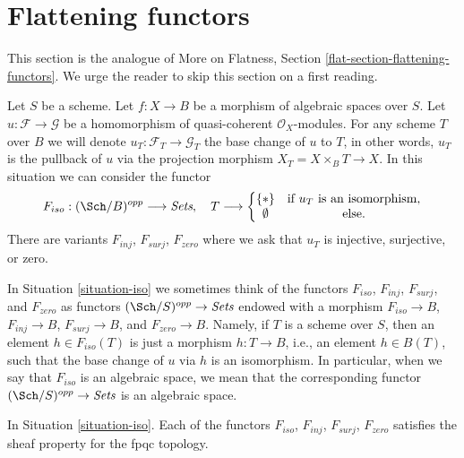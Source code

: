 \section{Flattening functors}
\label{section-F-zero}

\noindent
This section is the analogue of
More on Flatness, Section \ref{flat-section-flattening-functors}.
We urge the reader to skip this section on a first reading.

\begin{situation}
\label{situation-iso}
Let $S$ be a scheme.
Let $f : X \to B$ be a morphism of algebraic spaces over $S$.
Let $u : \mathcal{F} \to \mathcal{G}$ be a homomorphism of
quasi-coherent $\mathcal{O}_X$-modules. For any scheme $T$ over
$B$ we will denote $u_T : \mathcal{F}_T \to \mathcal{G}_T$ the
base change of $u$ to $T$, in other words, $u_T$ is the pullback
of $u$ via the projection morphism $X_T = X \times_B T \to X$.
In this situation we can consider the functor
\begin{equation}
\label{equation-iso}
F_{iso} : (\Sch/B)^{opp} \longrightarrow \textit{Sets}, \quad
T \longrightarrow \left\{
\begin{matrix}
\{*\} & \text{if }u_T\text{ is an isomorphism}, \\
\emptyset & \text{else.}
\end{matrix}
\right.
\end{equation}
There are variants $F_{inj}$, $F_{surj}$, $F_{zero}$ where we ask that
$u_T$ is injective, surjective, or zero.
\end{situation}

\noindent
In Situation \ref{situation-iso} we sometimes think of the functors
$F_{iso}$, $F_{inj}$, $F_{surj}$, and $F_{zero}$ as functors
$(\Sch/S)^{opp} \to \textit{Sets}$ endowed with a morphism
$F_{iso} \to B$, $F_{inj} \to B$, $F_{surj} \to B$, and $F_{zero} \to B$.
Namely, if $T$ is a scheme over $S$, then an element $h \in F_{iso}(T)$
is just a morphism $h : T \to B$, i.e., an element $h \in B(T)$,
such that the base change of $u$ via $h$ is an isomorphism.
In particular, when we say
that $F_{iso}$ is an algebraic space, we mean that the corresponding
functor $(\Sch/S)^{opp} \to \textit{Sets}$ is an algebraic space.

\begin{lemma}
\label{lemma-iso-sheaf}
In Situation \ref{situation-iso}.
Each of the functors $F_{iso}$, $F_{inj}$, $F_{surj}$, $F_{zero}$
satisfies the sheaf property for the fpqc topology.
\end{lemma}

